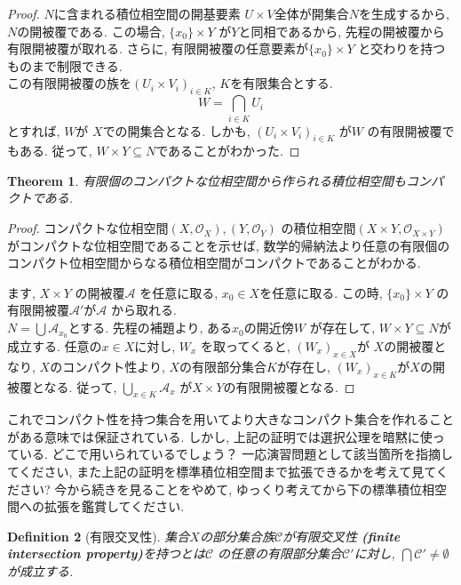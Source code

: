 \documentclass[lualatex]{ltjsbook}
\newtheorem{theorem}{Theorem}[section]
\newtheorem{definition}[theorem]{Definition}
\theoremstyle{remark}
\theoremstyle{plain}
\begin{document}
\begin{proof}
	$N$に含まれる積位相空間の開基要素 $ U\times V $全体が開集合$N$を生成するから,  $N$の開被覆である. この場合,  $\{x_0\} \times Y$ が$Y$と同相であるから, 先程の開被覆から有限開被覆が取れる. さらに,  有限開被覆の任意要素が$\{x_0\} \times Y $ と交わりを持つものまで制限できる. \\
	この有限開被覆の族を$\left( U_i \times V_i \right) _{i\in K}$, $K$を有限集合とする. 
	$$
	W=\bigcap_{i \in K}U_i 
	$$
	とすれば, $W$が $X$での開集合となる. しかも,  $\left( U_i \times V_i \right) _{i \in K}$ が$W$ の有限開被覆でもある. 従って, $W \times Y\subseteq N$であることがわかった.
\end{proof}

\begin{theorem}
	有限個のコンパクトな位相空間から作られる積位相空間もコンパクトである.
\end{theorem}

\begin{proof}
	コンパクトな位相空間$\left( X , \mathcal{O}_{X} \right),\left( Y , \mathcal{O}_{Y} \right)$
	の積位相空間$\left( X\times Y , \mathcal{O}_{X\times Y} \right)$がコンパクトな位相空間であることを示せば, 数学的帰納法より任意の有限個のコンパクト位相空間からなる積位相空間がコンパクトであることがわかる.

	ます, $X \times Y$ の開被覆$\mathcal{A}$ を任意に取る, $x_0 \in X$を任意に取る.
	この時, $\{x_0\} \times Y$ の有限開被覆$\mathcal{A}'$が$\mathcal{A}$ から取れる. \\
	$N = \bigcup \mathcal{A}_{x_0}$とする. 先程の補題より, ある$x_0$の開近傍$W$ が存在して, $W \times Y \subseteq N$が成立する.
	任意の$x \in X$に対し, $W_{x}$ を取ってくると, $\left( W_x \right)_{x \in X}$が $X$の開被覆となり,
	 $X$のコンパクト性より,  $X$の有限部分集合$K$が存在し,  $\left( W_x \right) _{x \in K}$が$X$の開被覆となる.
	 従って, $\bigcup_{x \in K} \mathcal{A}_x $ が$X \times Y$の有限開被覆となる.
\end{proof}

これでコンパクト性を持つ集合を用いてより大きなコンパクト集合を作れること
がある意味では保証されている. しかし, 上記の証明では選択公理を暗黙に使っている. どこで用いられているでしょう？
一応演習問題として該当箇所を指摘してください, また上記の証明を標準積位相空間まで拡張できるかを考えて見てください? 今から続きを見ることをやめて, ゆっくり考えてから下の標準積位相空間への拡張を鑑賞してください.

\begin{definition}[有限交叉性]
	集合$X$の部分集合族$\mathcal{C}$が有限交叉性 
	\textbf{(finite intersection property)}を持つとは$\mathcal{C}$ 
	の任意の有限部分集合$\mathcal{C}'$に対し, $\bigcap \mathcal{C}' \neq \emptyset$ が成立する.
\end{definition}
\end{document}
